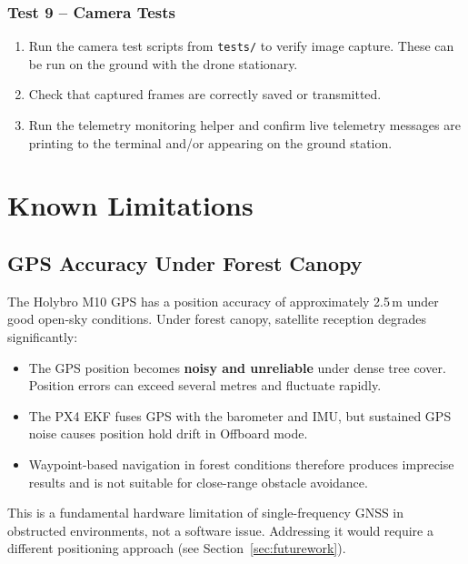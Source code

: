\documentclass{article}
\begin{document}
\subsubsection{Test 9 -- Camera Tests}

\begin{enumerate}
    \item Run the camera test scripts from \texttt{tests/} to verify image capture. These can be run on the ground with the drone stationary.
    \item Check that captured frames are correctly saved or transmitted.
    \item Run the telemetry monitoring helper and confirm live telemetry messages are printing to the terminal and/or appearing on the ground station.
\end{enumerate}

\section{Known Limitations}

\subsection{GPS Accuracy Under Forest Canopy}

The Holybro M10 GPS has a position accuracy of approximately 2.5\,m under good open-sky conditions. Under forest canopy, satellite reception degrades significantly:

\begin{itemize}
    \item The GPS position becomes \textbf{noisy and unreliable} under dense tree cover. Position errors can exceed several metres and fluctuate rapidly.
    \item The PX4 EKF fuses GPS with the barometer and IMU, but sustained GPS noise causes position hold drift in Offboard mode.
    \item Waypoint-based navigation in forest conditions therefore produces imprecise results and is not suitable for close-range obstacle avoidance.
\end{itemize}

This is a fundamental hardware limitation of single-frequency GNSS in obstructed environments, not a software issue. Addressing it would require a different positioning approach (see Section~\ref{sec:futurework}).
\end{document}
